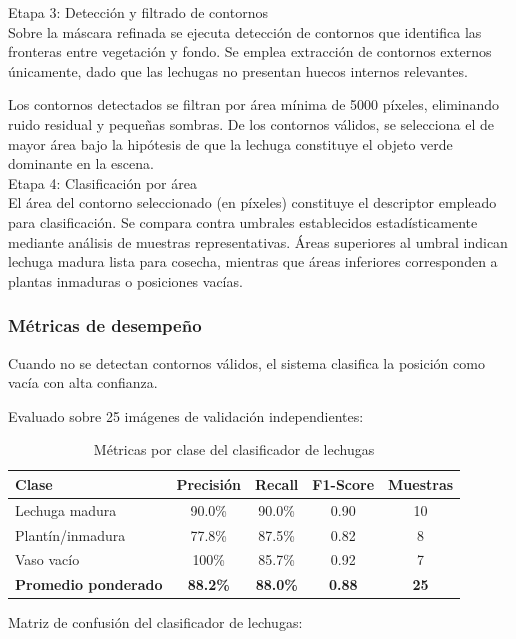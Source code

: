 Etapa 3: Detección y filtrado de contornos\\
\noindent
Sobre la máscara refinada se ejecuta detección de contornos que identifica las fronteras entre vegetación y fondo. Se emplea extracción de contornos externos únicamente, dado que las lechugas no presentan huecos internos relevantes.

Los contornos detectados se filtran por área mínima de 5000 píxeles, eliminando ruido residual y pequeñas sombras. De los contornos válidos, se selecciona el de mayor área bajo la hipótesis de que la lechuga constituye el objeto verde dominante en la escena.\\

Etapa 4: Clasificación por área\\
\noindent
El área del contorno seleccionado (en píxeles) constituye el descriptor empleado para clasificación. Se compara contra umbrales establecidos estadísticamente mediante análisis de muestras representativas. Áreas superiores al umbral indican lechuga madura lista para cosecha, mientras que áreas inferiores corresponden a plantas inmaduras o posiciones vacías.
\subsubsection{Métricas de desempeño}
Cuando no se detectan contornos válidos, el sistema clasifica la posición como vacía con alta confianza.

Evaluado sobre 25 imágenes de validación independientes:

\begin{table}[H]
\centering
\begin{tabular}{|l|c|c|c|c|}
\hline
\textbf{Clase} & \textbf{Precisión} & \textbf{Recall} & \textbf{F1-Score} & \textbf{Muestras} \\ \hline
Lechuga madura & 90.0\% & 90.0\% & 0.90 & 10 \\ \hline
Plantín/inmadura & 77.8\% & 87.5\% & 0.82 & 8 \\ \hline
Vaso vacío & 100\% & 85.7\% & 0.92 & 7 \\ \hline
\textbf{Promedio ponderado} & \textbf{88.2\%} & \textbf{88.0\%} & \textbf{0.88} & \textbf{25} \\ \hline
\end{tabular}
\caption{Métricas por clase del clasificador de lechugas}
\label{tab:metricas_lechugas}
\end{table}

Matriz de confusión del clasificador de lechugas:

